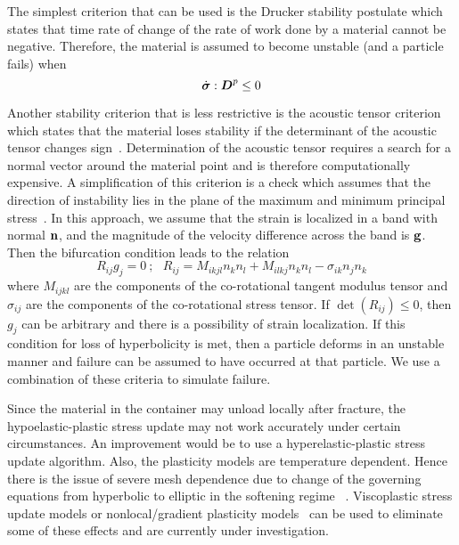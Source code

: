   The simplest criterion that can be used is the Drucker stability postulate 
  \cite{Drucker1959} which states that time rate of change of the rate of 
  work done by a material cannot be negative.  Therefore, the material is 
  assumed to become unstable (and a particle fails) when
  \begin{equation}
    \dot{\boldsymbol{\sigma}}:\boldsymbol{D}^p \le 0
  \end{equation}

  Another stability criterion that is less restrictive is the acoustic
  tensor criterion which states that the material loses stability if the 
  determinant of the acoustic tensor changes sign~\cite{Rudnicki1975,Perzyna1998}.  
  Determination of the acoustic tensor requires a search for a normal vector 
  around the material point and is therefore computationally expensive.  A 
  simplification of this criterion is a check which assumes that the direction 
  of instability lies in the plane of the maximum and minimum principal 
  stress~\cite{Becker2002}.  In this approach, we assume that the strain is 
  localized in a band with normal $\mathbf{n}$, and the magnitude of the velocity 
  difference across the band is $\mathbf{g}$.  Then the bifurcation condition 
  leads to the relation 
  \begin{equation} 
    R_{ij} g_{j} = 0 ~;~~~
    R_{ij} = M_{ikjl} n_k n_l + M_{ilkj} n_k n_l - \sigma_{ik} n_j n_k
  \end{equation} 
  where $M_{ijkl}$ are the components of the co-rotational tangent
  modulus tensor and $\sigma_{ij}$ are the components of the co-rotational 
  stress tensor.  If $\det(R_{ij}) \le 0 $, then $g_j$ can be arbitrary and 
  there is a possibility of strain localization.  If this condition for 
  loss of hyperbolicity is met,  then a particle deforms in an unstable 
  manner and failure can be assumed to have occurred at that particle.  
  We use a combination of these criteria to simulate failure.

  Since the material in the container may unload locally after fracture, the 
  hypoelastic-plastic stress update may not work accurately under certain 
  circumstances.  An improvement would be to use a hyperelastic-plastic stress 
  update algorithm.  Also, the plasticity models are temperature dependent.
  Hence there is the issue of severe mesh dependence due to change of the
  governing equations from hyperbolic to elliptic in the softening regime
  ~\cite{Hill1975,Bazant1985,Tver1990}.  Viscoplastic stress update models or 
  nonlocal/gradient plasticity models~\cite{Ramaswamy1998,Hao2000} can be used 
  to eliminate some of these effects and are currently under investigation. 


